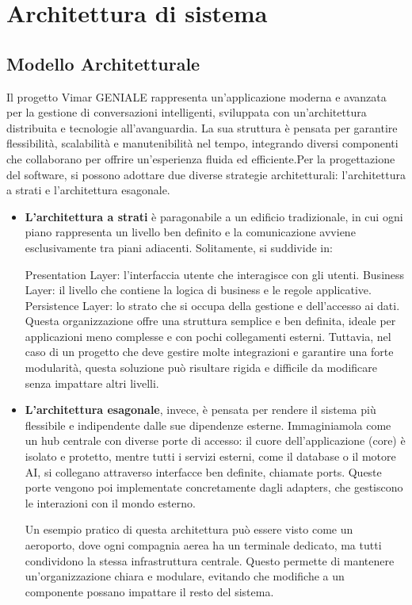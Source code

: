 

\section{Architettura di sistema }
\subsection{Modello Architetturale}
Il progetto Vimar GENIALE rappresenta un’applicazione moderna e avanzata per la gestione di conversazioni intelligenti, sviluppata con un’architettura distribuita e tecnologie all’avanguardia. La sua struttura è pensata per garantire flessibilità, scalabilità e manutenibilità nel tempo, integrando diversi componenti che collaborano per offrire un’esperienza fluida ed efficiente.Per la progettazione del software, si possono adottare due diverse strategie architetturali: l’architettura a strati e l’architettura esagonale.
\begin{itemize}
\item \textbf{L’architettura a strati} è paragonabile a un edificio tradizionale, in cui ogni piano rappresenta un livello ben definito e la comunicazione avviene esclusivamente tra piani adiacenti. Solitamente, si suddivide in:

Presentation Layer: l’interfaccia utente che interagisce con gli utenti.
Business Layer: il livello che contiene la logica di business e le regole applicative.
Persistence Layer: lo strato che si occupa della gestione e dell’accesso ai dati.
Questa organizzazione offre una struttura semplice e ben definita, ideale per applicazioni meno complesse e con pochi collegamenti esterni. Tuttavia, nel caso di un progetto che deve gestire molte integrazioni e garantire una forte modularità, questa soluzione può risultare rigida e difficile da modificare senza impattare altri livelli.
\end{itemize}
\begin{itemize}
\item \textbf{L’architettura esagonale}, invece, è pensata per rendere il sistema più flessibile e indipendente dalle sue dipendenze esterne. Immaginiamola come un hub centrale con diverse porte di accesso: il cuore dell’applicazione (core) è isolato e protetto, mentre tutti i servizi esterni, come il database o il motore AI, si collegano attraverso interfacce ben definite, chiamate ports. Queste porte vengono poi implementate concretamente dagli adapters, che gestiscono le interazioni con il mondo esterno.

Un esempio pratico di questa architettura può essere visto come un aeroporto, dove ogni compagnia aerea ha un terminale dedicato, ma tutti condividono la stessa infrastruttura centrale. Questo permette di mantenere un’organizzazione chiara e modulare, evitando che modifiche a un componente possano impattare il resto del sistema.
\end{itemize}

